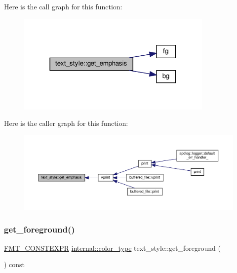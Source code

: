 Here is the call graph for this function\+:
\nopagebreak
\begin{figure}[H]
\begin{center}
\leavevmode
\includegraphics[width=271pt]{classtext__style_aecbbaaf438871b55905c4beaea7318b5_cgraph}
\end{center}
\end{figure}
Here is the caller graph for this function\+:
\nopagebreak
\begin{figure}[H]
\begin{center}
\leavevmode
\includegraphics[width=350pt]{classtext__style_aecbbaaf438871b55905c4beaea7318b5_icgraph}
\end{center}
\end{figure}
\mbox{\label{classtext__style_a695368429b582c3fef9b28e138beec4a}} 
\subsubsection{\texorpdfstring{get\+\_\+foreground()}{get\_foreground()}}
{\footnotesize\ttfamily \hyperlink{core_8h_a69201cb276383873487bf68b4ef8b4cd}{F\+M\+T\+\_\+\+C\+O\+N\+S\+T\+E\+X\+PR} \hyperlink{structinternal_1_1color__type}{internal\+::color\+\_\+type} text\+\_\+style\+::get\+\_\+foreground (\begin{DoxyParamCaption}{ }\end{DoxyParamCaption}) const\hspace{0.3cm}{\ttfamily [inline]}}



